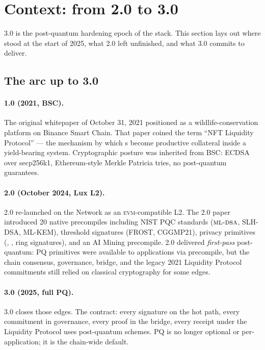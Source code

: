 \section{Context: from 2.0 to 3.0}
\label{sec:context}

\Zoo{} 3.0 is the post-quantum hardening epoch of the \Zoo{} stack.
This section lays out where \Zoo{} stood at the start of 2025, what
\Zoo{} 2.0 left unfinished, and what 3.0 commits to deliver.

\subsection{The arc up to 3.0}

\paragraph{1.0 (2021, BSC).}
The original \Zoo{} whitepaper of October 31, 2021 \cite{zoo-2021}
positioned \Zoo{} as a wildlife-conservation platform on Binance Smart
Chain. That paper coined the term ``NFT Liquidity Protocol'' --- the
mechanism by which \NFT{}s become productive collateral inside a
yield-bearing system. Cryptographic posture was inherited from BSC:
ECDSA over secp256k1, Ethereum-style Merkle Patricia tries, no
post-quantum guarantees.

\paragraph{2.0 (October 2024, Lux L2).}
\Zoo{} 2.0 \cite{zoo-2-0} re-launched on the \Lux{} Network as an
\textsc{evm}-compatible L2. The 2.0 paper introduced 20 native
precompiles including NIST PQC standards ($\textsc{ml-dsa}{}$, SLH-DSA,
ML-KEM), threshold signatures (FROST, CGGMP21), privacy primitives
(\FHE{}, \ZKP{}, ring signatures), and an AI Mining precompile. 2.0
delivered \emph{first-pass} post-quantum: PQ primitives were available
to applications via precompile, but the chain consensus, governance,
bridge, and the legacy 2021 \NFT{} Liquidity Protocol commitments
still relied on classical cryptography for some edges.

\paragraph{3.0 (2025, full PQ).}
\Zoo{} 3.0 closes those edges. The contract: every signature on the
hot path, every commitment in governance, every proof in the bridge,
every receipt under the \NFT{} Liquidity Protocol uses post-quantum
schemes. PQ is no longer optional or per-application; it is the
chain-wide default.

